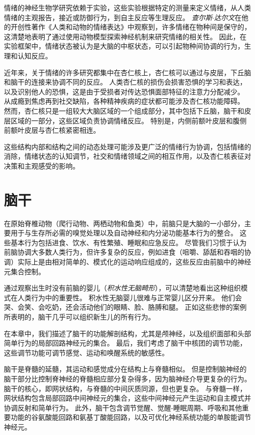 情绪的神经生物学研究依赖于实验，这些实验根据特定的测量来定义情绪，从人类情绪的主观报告，接近或防御行为，到自主反应等生理反应。
\textit{查尔斯$\cdot$达尔文}在他的开创性著作《人类和动物的情绪表达》中观察到，许多情绪在物种间是保守的，这清楚地表明了通过使用动物模型探索神经机制来研究情绪的相关性。
因此，在实验框架中，情绪状态被认为是大脑的中枢状态，可以引起物种间协调的行为，生理和认知反应。


近年来，关于情绪的许多研究都集中在杏仁核上，杏仁核可以通过与皮层，下丘脑和脑干的连接来协调不同的反应。
人类杏仁核的损伤会损害恐惧的学习和表达，以及识别他人的恐惧，这是由于受损者对传达恐惧面部特征的注意力分配减少。
从成瘾到焦虑再到社交缺陷，各种精神疾病的症状都可能涉及杏仁核功能障碍。
然而，杏仁核只是一组较大大脑区域的一个组成部分，其中包括下丘脑，脑干和皮层区域的一部分，这些区域负责协调情绪反应。
特别是，内侧前额叶皮层和腹侧前额叶皮层与杏仁核紧密相连。

这些结构内部和结构之间的动态处理可能涉及更广泛的情绪行为协调，包括情绪的消除，情绪状态的认知调节，社交和情绪领域之间的相互作用，以及杏仁核表征对决策和主观感受的影响。


\chapter{脑干} \label{chap:chap40}

在原始脊椎动物（爬行动物、两栖动物和鱼类）中，前脑只是大脑的一小部分，主要用于与生存所必需的嗅觉处理以及自动神经和内分泌功能基本行为的整合。
这些基本行为包括进食、饮水、有性繁殖、睡眠和应急反应。
尽管我们习惯于认为前脑协调大多数人类行为，但许多复杂的反应，例如进食（咀嚼、舔舐和吞咽的协调）实际上是由相对简单的、模式化的运动响应组成的，这些反应由前脑中的神经元集合控制。


通过观察出生时没有前脑的婴儿（\textit{积水性无脑畸形}），可以清楚地看出这种组织模式在人类行为中的重要性。
积水性无脑婴儿很难与正常婴儿区分开来。
他们会哭、会笑、会吃奶，还会活动他们的眼睛、脸、胳膊和腿。
正如这些悲惨的案例所表明的，脑干几乎可以组织新生儿的所有行为。


在本章中，我们描述了脑干的功能解剖结构，尤其是颅神经，以及组织面部和头部简单行为的局部回路神经元的集合。
最后，我们考虑了脑干中核团的调节功能，这些调节功能可调节感觉、运动和唤醒系统的敏感性。


脑干是脊髓的延髓，其运动和感觉成分在结构上与脊髓相似。
但是控制脑神经的脑干部分比控制脊神经的脊髓相应部分复杂得多，因为脑神经介导更复杂的行为。
脑干的核心，即网状结构，与脊髓的中间灰质同源，但也更复杂。
与脊髓一样，网状结构包含局部回路中间神经元的集合，这些中间神经元产生运动和自主模式并协调反射和简单行为。
此外，脑干包含调节觉醒、觉醒-睡眠周期、呼吸和其他重要功能的谷氨酸能回路和氨基丁酸能回路，以及可优化神经系统功能的单胺能调节神经元。



